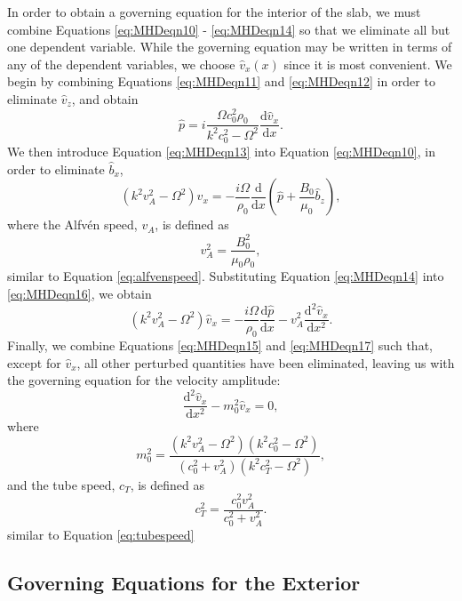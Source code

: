 \documentclass[12pt]{ociamthesis}
\begin{document}
In order to obtain a governing equation for the interior of the slab, we must combine Equations \eqref{eq:MHDeqn10} - \eqref{eq:MHDeqn14} so that we eliminate all but one dependent variable.
While the governing equation may be written in terms of any of the dependent variables, we choose $\hat v_x (x)$ since it is most convenient.
We begin by combining Equations \eqref{eq:MHDeqn11} and \eqref{eq:MHDeqn12} in order to eliminate $\hat v_z$, and obtain
%
\begin{equation}
\label{eq:MHDeqn15}
\hat p = i \frac{\Omega c_0^2 \rho_0}{k^2 c_0^2 - \Omega^2} \frac{\mathrm{d} \hat v_x}{\mathrm{d} x}.
\end{equation}
%
We then introduce Equation \eqref{eq:MHDeqn13} into Equation \eqref{eq:MHDeqn10}, in order to eliminate $\hat b_x$,
%
\begin{equation}
\label{eq:MHDeqn16}
(k^2 v_A^2 - \Omega^2) \hat v_x = - \frac{i \Omega}{\rho_0} \frac{\mathrm{d}}{\mathrm{d} x} \left(\hat p + \frac{B_0}{\mu_0} \hat b_z \right),
\end{equation}
where the Alfv\'en speed, $v_A$, is defined as
%
\[
v_A^2 = \frac{B_0^2}{\mu_0 \rho_0},
\]
%
similar to Equation \ref{eq:alfvenspeed}.
%
Substituting Equation \eqref{eq:MHDeqn14} into \eqref{eq:MHDeqn16}, we obtain
%
\begin{equation}
\label{eq:MHDeqn17}
(k^2 v_A^2 - \Omega^2) \hat v_x = - \frac{i \Omega}{\rho_0} \frac{\mathrm{d} \hat p}{\mathrm{d} x}
- v_A^2 \frac{\mathrm{d}^2 \hat v_x}{\mathrm{d} x^2}.
\end{equation}
%
Finally, we combine Equations \eqref{eq:MHDeqn15} and \eqref{eq:MHDeqn17} such that, except for $\hat{v}_x$, all other perturbed quantities have been eliminated, leaving us with the governing equation for the velocity amplitude:
%
\begin{equation}
\label{eq:goveq1}
\frac{\mathrm{d}^2 \hat v_x}{\mathrm{d} x^2} - m_0^2 \hat{v}_x = 0,
\end{equation}
%
where
%
\begin{equation}
\label{eq:m0slab}
m_0^2 = \frac{(k^2 v_A^2 - \Omega^2)(k^2 c_0^2 - \Omega^2)}
{(c_0^2 + v_A^2)( k^2 c_T^2 - \Omega^2)},
\end{equation}
%
and the tube speed, $c_T$, is defined as
%
\[
c_T^2 = \frac{c_0^2 v_A^2}{c_0^2 + v_A^2}.
\]
%
similar to Equation \eqref{eq:tubespeed} %



\subsection{Governing Equations for the Exterior}
\label{subsec:goveqext}
\end{document}
